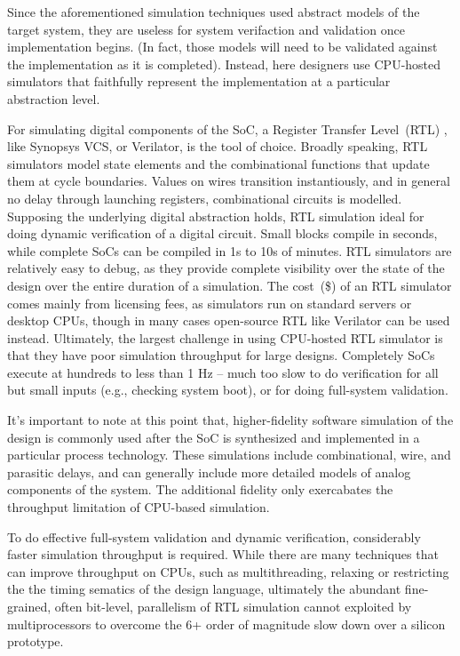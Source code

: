 Since the aforementioned simulation techniques used abstract models of the
target system, they are useless for system verifaction and validation once
implementation begins. (In fact, those models will need to be validated against the
implementation as it is completed). Instead, here designers use CPU-hosted
simulators that faithfully represent the implementation at a particular
abstraction level.

For simulating digital components of the SoC, a Register Transfer Level~(RTL) ,
like Synopsys VCS, or Verilator, is the tool of choice. Broadly speaking, RTL
simulators model state elements and the combinational functions that update
them at cycle boundaries. Values on wires transition instantiously, and in
general no delay through launching registers, combinational circuits is
modelled. Supposing the underlying digital abstraction holds, RTL simulation
ideal for doing dynamic verification of a digital circuit. Small blocks compile
in seconds, while complete SoCs can be compiled in 1s to 10s of minutes. RTL
simulators are relatively easy to debug, as they provide complete visibility
over the state of the design over the entire duration of a simulation. The
cost~(\$) of an RTL simulator comes mainly from licensing fees, as simulators
run on standard servers or desktop CPUs, though in many cases open-source RTL
like Verilator can be used instead. Ultimately, the largest challenge in using
CPU-hosted RTL simulator is that they have poor simulation throughput for large
designs. Completely SoCs execute at hundreds to less than 1 Hz -- much too slow
to do verification for all but small inputs (e.g., checking system boot), or
for doing full-system validation.

It's important to note at this point that, higher-fidelity software simulation
of the design is commonly used after the SoC is synthesized and implemented in
a particular process technology.  These simulations include combinational,
wire, and parasitic delays, and can generally include more detailed models of
analog components of the system. The additional fidelity only exercabates the
throughput limitation of CPU-based simulation.

To do effective full-system validation and dynamic verification, considerably
faster simulation throughput is required. While there are many techniques that
can improve throughput on CPUs, such as multithreading, relaxing or restricting
the the timing sematics of the design language, ultimately the abundant
fine-grained, often bit-level, parallelism of RTL simulation cannot exploited
by multiprocessors to overcome the 6+ order of magnitude slow down over a
silicon prototype.

